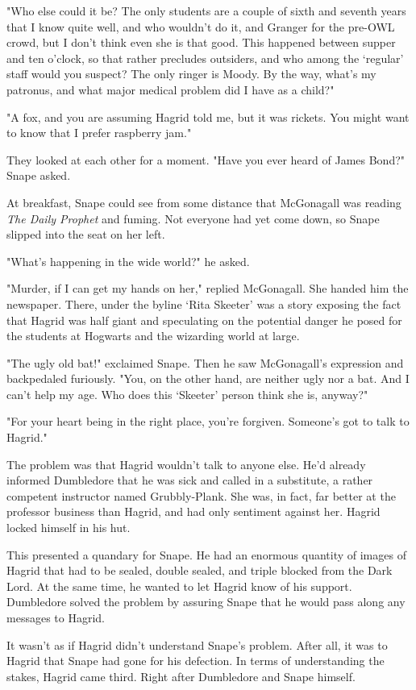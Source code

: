 "Who else could it be? The only students are a couple of sixth and seventh years that I know quite well, and who wouldn't do it, and Granger for the pre-OWL crowd, but I don't think even she is that good. This happened between supper and ten o'clock, so that rather precludes outsiders, and who among the `regular' staff would you suspect? The only ringer is Moody. By the way, what's my patronus, and what major medical problem did I have as a child?"

"A fox, and you are assuming Hagrid told me, but it was rickets. You might want to know that I prefer raspberry jam."

They looked at each other for a moment. "Have you ever heard of James Bond?" Snape asked.

At breakfast, Snape could see from some distance that McGonagall was reading \emph{The Daily Prophet} and fuming. Not everyone had yet come down, so Snape slipped into the seat on her left.

"What's happening in the wide world?" he asked.

"Murder, if I can get my hands on her," replied McGonagall. She handed him the newspaper. There, under the byline `Rita Skeeter' was a story exposing the fact that Hagrid was half giant and speculating on the potential danger he posed for the students at Hogwarts and the wizarding world at large.

"The ugly old bat!" exclaimed Snape. Then he saw McGonagall's expression and backpedaled furiously. "You, on the other hand, are neither ugly nor a bat. And I can't help my age. Who does this `Skeeter' person think she is, anyway?"

"For your heart being in the right place, you're forgiven. Someone's got to talk to Hagrid."

The problem was that Hagrid wouldn't talk to anyone else. He'd already informed Dumbledore that he was sick and called in a substitute, a rather competent instructor named Grubbly-Plank. She was, in fact, far better at the professor business than Hagrid, and had only sentiment against her. Hagrid locked himself in his hut.

This presented a quandary for Snape. He had an enormous quantity of images of Hagrid that had to be sealed, double sealed, and triple blocked from the Dark Lord. At the same time, he wanted to let Hagrid know of his support. Dumbledore solved the problem by assuring Snape that he would pass along any messages to Hagrid.

It wasn't as if Hagrid didn't understand Snape's problem. After all, it was to Hagrid that Snape had gone for his defection. In terms of understanding the stakes, Hagrid came third. Right after Dumbledore and Snape himself.


